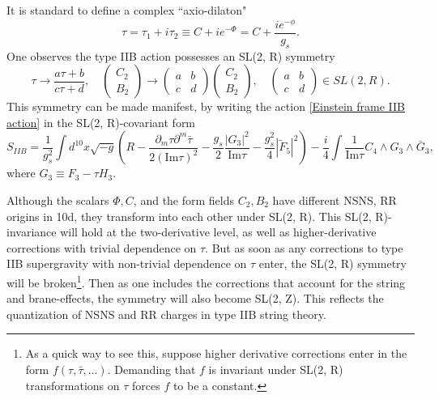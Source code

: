 It is standard to define a complex ``axio-dilaton"
\begin{equation}
\tau=\tau_1+i\tau_2 \equiv C + ie^{-\Phi} = C + \frac{ie^{-\phi}}{g_s}.
\end{equation}
One observes the type IIB action possesses an SL(2, R) symmetry
\begin{equation}
\tau\to\frac{a\tau+b}{c\tau+d},\quad
\begin{pmatrix}
C_2\\ B_2
\end{pmatrix}\to
\begin{pmatrix}
a & b \\ c&d
\end{pmatrix}
\begin{pmatrix}
C_2\\ B_2
\end{pmatrix},\quad
\begin{pmatrix}
a & b \\ c&d
\end{pmatrix}\in SL(2, R).
\label{IIB SL(2, R) transformations}
\end{equation}
This symmetry can be made manifest, by writing the action \eqref{Einstein frame IIB action} in the SL(2, R)-covariant form \cite{Weigand:2018rez,ValeixoBento:2025emh}
\begin{equation}
S_{IIB}
=\frac{1}{g_s^2}\int d^{10}x\sqrt{-g}\left(
R - \frac{\partial_m\tau \partial^m\bar\tau}{2(\text{Im} \tau)^2} - \frac{g_s}{2}\frac{|G_3|^2}{\text{Im} \tau}
-\frac{g_s^2}{4}|\tilde F_5|^2
\right)
-\frac{i}{4}\int \frac{1}{\text{Im} \tau}C_4\wedge G_3\wedge \bar G_3,
\label{SL(2, R) maniest IIB action}
\end{equation}
where $G_3 \equiv F_3-\tau H_3$.

Although the scalars $\Phi, C$, and the form fields $C_2, B_2$ have different NSNS, RR origins in 10d, they transform into each other under SL(2, R). 
This SL(2, R)-invariance will hold at the two-derivative level, as well as higher-derivative corrections with trivial dependence on $\tau$.
But as soon as any corrections to type IIB supergravity with non-trivial dependence on $\tau$ enter, the SL(2, R) symmetry will be broken\footnote{As a quick way to see this, suppose higher derivative corrections enter in the form $f(\tau,\bar\tau,...)$. Demanding that $f$ is invariant under SL(2, R) transformations on $\tau$ forces $f$ to be a constant.}. 
Then as one includes the corrections that account for the string and brane-effects, the symmetry will also become SL(2, Z).
This reflects the quantization of NSNS and RR charges in type IIB string theory.

